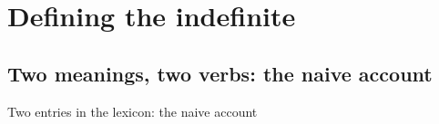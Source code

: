 \section{Defining the indefinite} 


\subsection{Two meanings, two verbs: the naive account} 

Two entries in the lexicon: the naive account







